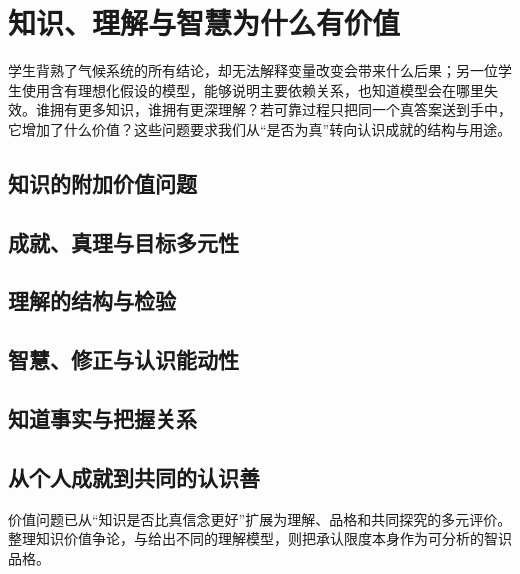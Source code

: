 \chapter{知识、理解与智慧为什么有价值}

\begin{openingcase}
学生背熟了气候系统的所有结论，却无法解释变量改变会带来什么后果；另一位学生使用含有理想化假设的模型，能够说明主要依赖关系，也知道模型会在哪里失效。谁拥有更多知识，谁拥有更深理解？若可靠过程只把同一个真答案送到手中，它增加了什么价值？这些问题要求我们从“是否为真”转向认识成就的结构与用途。
\end{openingcase}

\section{知识的附加价值问题}


\section{成就、真理与目标多元性}


\section{理解的结构与检验}


\section{智慧、修正与认识能动性}



\section{知道事实与把握关系}



\section{从个人成就到共同的认识善}


价值问题已从“知识是否比真信念更好”扩展为理解、品格和共同探究的多元评价。\textcite{pritchard2010}整理知识价值争论，\textcite{elgin2017}与\textcite{khalifa2017}给出不同的理解模型，\textcite{whitcomb2017}则把承认限度本身作为可分析的智识品格。

